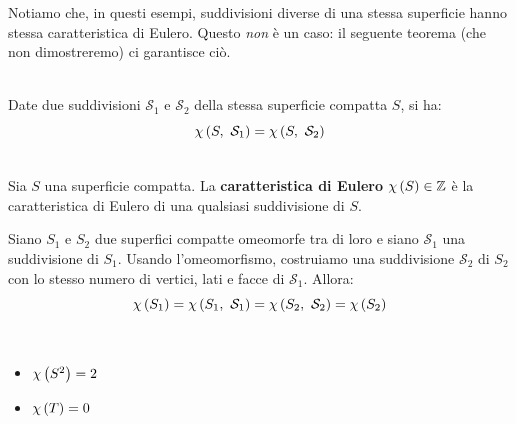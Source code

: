 Notiamo che, in questi esempi, suddivisioni diverse di una stessa superficie hanno stessa caratteristica di Eulero. Questo \textit{non} è un caso: il seguente teorema (che non dimostreremo) ci garantisce ciò.
\begin{theorema}~{}\\
	Date due suddivisioni $\mathcal{S}_1$ e $\mathcal{S}_2$ della stessa superficie compatta $S$, si ha:
	\begin{equation*}
		\euler{S}{\mathcal{S}_1}=\euler{S}{\mathcal{S}_2}
	\end{equation*}
\vspace{-6mm}
\end{theorema}
\begin{define}~{}\\
	Sia $S$ una superficie compatta. La \textbf{caratteristica di Eulero} $\euler{S}{\ }\in \integerset$ è la caratteristica di Eulero di una qualsiasi suddivisione di $S$.
\end{define}
\begin{corollary}
\end{corollary}
\begin{demonstration}
	Siano $S_1$ e $S_2$ due superfici compatte omeomorfe tra di loro e siano $\mathcal{S}_1$ una suddivisione di $S_1$. Usando l'omeomorfismo, costruiamo una suddivisione $\mathcal{S}_2$ di $S_2$ con lo stesso numero di vertici, lati e facce di $\mathcal{S}_1$. Allora:
	\begin{equation*}
		\euler{S_1}{\ }=\euler{S_1}{\mathcal{S}_1}=\euler{S_2}{\mathcal{S}_2}=\euler{S_2}{\ }
	\end{equation*}
\vspace{-3mm}
\end{demonstration}
\begin{example}~{}
	\begin{itemize}
		\item $\euler{S^2}{\ }=2$
		\item $\euler{T}{\ }=0$
	\end{itemize}
\vspace{-3mm}
\end{example}
